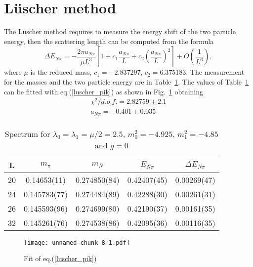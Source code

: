 \documentclass[10pt,a4paper]{article}
\begin{document}
\newpage 
\section{L\"uscher method} 

The L\"uscher method requires to measure the energy shift of the two particle energy, then the scattering length can be computed from the formula
\begin{equation}
  \Delta E_{N\pi}=-\frac{2\pi a_{N\pi}}{\mu L^3}\left[ 1 + c_1  \frac{a_{N\pi}}{L} + c_2\left(\frac{a_{N\pi}}{L}\right)^2  \right] +O(\frac{1}{L^6}),
  \label{luscher_pik}
\end{equation}
where $\mu$ is the reduced mass, $c_1=- 2.837297 $,  $c_2=6.375183$.
The measurement for the masses and the two particle energy are in Table~\ref{tab:spectrum}.
The values of Table~\ref{tab:spectrum} can be fitted with eq.(\ref{luscher_pik}) as shown in Fig.~\ref{fit_luscher_aNpi} obtaining 
\begin{gather}
\chi^2/d.o.f.=2.82759\pm 2.1 \\ 
a_{N\pi}=-0.401\pm 0.035 \\ 
\end{gather}


\begin{table}[!h]
\centering
\begin{tabular}{|c|c|c|c|c|}
\hline 
L & $m_\pi$ & $m_N$ & $E_{N\pi}$ & $\Delta E_{N\pi}$ \\ 
\hline 
20 & 0.14653(11)&	0.274850(84)&	0.42407(45)&	0.00269(47) \\ 
\hline 
24 & 0.145783(77)&	0.274484(89)&	0.42288(30)&	0.00261(31)\\ 
\hline 
26 & 0.145593(96)&	0.274699(80)&	0.42190(37)&	0.00161(35) \\ 
\hline 
32 & 0.145261(76)&	0.274538(86)&	0.42095(36)&	0.00116(35) \\ 
\hline 
\end{tabular} 
\caption{Spectrum for $\lambda_0=\lambda_1=\mu/2=2.5$,  $m_0^2=-4.925$, $m_1^2=-4.85$ and $g=0$}
\label{tab:spectrum}
 \end{table}
 
 \begin{figure}[!ht]
 \centering
\texttt{[image: unnamed-chunk-8-1.pdf]}
\caption{Fit of eq.(\ref{luscher_pik}) }
\label{fit_luscher_aNpi}
\end{figure}
 
 
 
\end{document}
